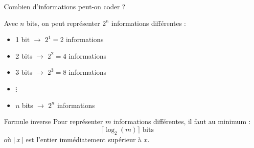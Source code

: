 \documentclass[aspectratio=1610]{beamer}
\begin{document}
\begin{frame}[allowframebreaks]{Combien d'informations peut-on coder ?}

  Avec $n$ bits, on peut représenter $2^n$ informations différentes :

  \vspace{0.5em}

  \begin{itemize}
    \item 1 bit  $\rightarrow$ $2^1 = 2$ informations
    \item 2 bits $\rightarrow$ $2^2 = 4$ informations
    \item 3 bits $\rightarrow$ $2^3 = 8$ informations
    \item $\vdots$
    \item $n$ bits $\rightarrow$ $2^n$ informations
  \end{itemize}

  \vspace{0.5em}

  \pause

  \begin{block}{Formule inverse}
    Pour représenter $m$ informations différentes, il faut au minimum :
    \[
      \lceil \log_2(m) \rceil \text{ bits}
    \]
    où $\lceil x \rceil$ est l'entier immédiatement supérieur à $x$.
  \end{block}


\end{frame}
\end{document}
